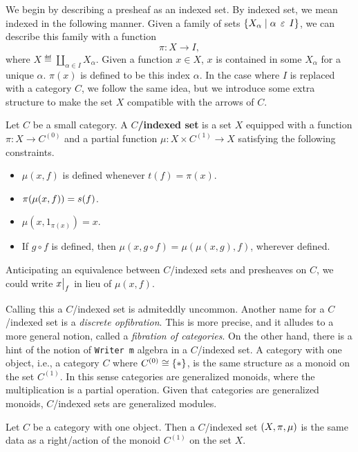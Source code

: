 \documentclass{../thesis-note}
\begin{document}
We begin by describing a presheaf as an indexed set. By indexed set, we mean
indexed in the following manner. Given a family of sets \({\left\{ X_\alpha \mid
  \alpha \mathrel{\,\varepsilon\,} I \right\}}\), we can describe this family with a function
\[%
  \pi : X \to I,
\]%
where \(X \eqdef \coprod_{\alpha \in I} X_\alpha\). Given a function \(x \in
X\), \(x\) is contained in some \(X_\alpha\) for a unique \(\alpha\). \(\pi(x)\)
is defined to be this index \(\alpha\). In the case where \(I\) is replaced with
a category \(C\), we follow the same idea, but we introduce some extra structure
to make the set \(X\) compatible with the arrows of \(C\).
\begin{definition}
  Let \(C\) be a small category. A \textbf{\(C\)\-/indexed set} is a set \(X\)
  equipped with a function \(\pi : X \to C^{(0)}\) and a partial function
  \(\mu : X \times C^{(1)} \to X\) satisfying the following constraints.
  \begin{itemize}
  \item \(\mu(x,f)\) is defined whenever \(t(f) = \pi(x)\).
  \item \(\pi{\left(\mu(x,f)\right)} = s(f)\).
  \item \(\mu(x,1_{\pi(x)}) = x\).
  \item If \(g \circ f\) is defined, then \(\mu(x,g\circ f) =
    \mu(\mu(x,g),f)\), wherever defined.
  \end{itemize}
  Anticipating an equivalence between \(C\)\-/indexed sets and presheaves on
  \(C\), we could write \(\restr{x}{f}\) in lieu of \(\mu(x,f)\).
\end{definition}
Calling this a \(C\)\-/indexed set is admiteddly uncommon. Another name for a
\(C\)\-/indexed set is a \emph{discrete opfibration}. This is more precise, and
it alludes to a more general notion, called a \emph{fibration of categories}. On
the other hand, there is a hint of the notion of \texttt{Writer m} algebra in a
\(C\)\-/indexed set. A category with one object, i.e., a category \(C\) where
\(C^{(0)} \cong {\left\{\ast\right\}}\), is the same structure as a monoid on the set
\(C^{(1)}\). In this sense categories are generalized monoids, where the
multiplication is a partial operation. Given that categories are generalized
monoids, \(C\)\-/indexed sets are generalized modules.
\begin{proposition}
  Let \(C\) be a category with one object. Then a \(C\)\-/indexed set
  \({\left(X,\pi,\mu\right)}\) is the same data as a right\-/action of the monoid
  \(C^{(1)}\) on the set \(X\).
\end{proposition}
\end{document}
